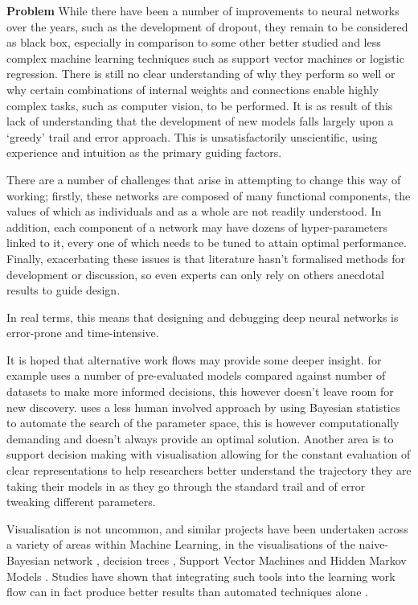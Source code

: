 \documentclass[a4paper,11pt,titlepage]{article}
\begin{document}
\textbf{Problem}	
		While there have been a number of improvements to neural networks over the years, such as the development of dropout, they remain to be considered as black box, especially in comparison to some other better studied and less complex machine learning techniques such as support vector machines or logistic regression. There is still no clear understanding of why they perform so well or why certain combinations of internal weights and connections enable highly complex tasks, such as computer vision, to be performed. It is as result of this lack of understanding that the development of new models falls largely upon a `greedy' trail and error approach. This is unsatisfactorily unscientific, using experience and intuition as the primary guiding factors.
		\par
		There are a number of challenges that arise in attempting to change this way of working; firstly, these networks are composed of many functional components, the values of which as individuals and as a whole are not readily understood. In addition, each component of a network may have dozens of hyper-parameters linked to it, every one of which needs to be tuned to attain optimal performance. Finally, exacerbating these issues is that literature hasn't formalised methods for development or discussion, so even experts can only rely on others anecdotal results to guide design.
		\par 
		In real terms, this means that designing and debugging deep neural networks is error-prone and time-intensive. 
		\par 
		It is hoped that alternative work flows may provide some deeper insight. \cite{Jarrett2009} for example uses a number of pre-evaluated models compared against number of datasets to make more informed decisions, this however doesn't leave room for new discovery. \cite{Bergstra2013} uses a less human involved approach by using Bayesian statistics to automate the search of the parameter space, this is however computationally demanding and doesn't always provide an optimal solution. Another area is to support decision making with visualisation allowing for the constant evaluation of clear representations to help researchers better understand the trajectory they are taking their models in as they go through the standard trail and of error tweaking different parameters.
		\par
		Visualisation is not uncommon, and similar projects have been undertaken across a variety of areas within Machine Learning, in the visualisations of the naive-Bayesian network \cite{Becker2001}, decision trees \cite{Ankerst1999}, Support Vector Machines \cite{Caragea2001} and Hidden Markov Models \cite{Dai2008}. Studies have shown that integrating such tools into the learning work flow can in fact produce better results than automated techniques alone \cite{Ware2002}.
\end{document}
